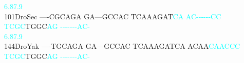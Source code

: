 \documentclass[11pt,twoside,reqno,a4paper]{article}
\begin{document}
{\hspace*{4\charwidth}\hspace*{7\charwidth}\hspace*{1\charwidth}\hspace*{1\charwidth}\hspace*{28\charwidth}\textcolor{cyan}{6.8}\hspace*{1\charwidth}\hspace*{1\charwidth}\hspace*{17\charwidth}\textcolor{cyan}{7.9}\hspace*{1\charwidth}\hspace*{1\charwidth}\\
101\hspace*{1\charwidth}DroSec	----CGCAGA	GA---GCCAC	TCAAAGAT\textcolor{cyan}{C}\textcolor{cyan}{A}	\textcolor{cyan}{A}\textcolor{cyan}{C}\textcolor{cyan}{-}\textcolor{cyan}{-}\textcolor{cyan}{-}\textcolor{cyan}{-}\textcolor{cyan}{-}\textcolor{cyan}{-}\textcolor{cyan}{C}\textcolor{cyan}{C}	\textcolor{cyan}{T}\textcolor{cyan}{C}\textcolor{cyan}{G}\textcolor{cyan}{C}TGGC\textcolor{cyan}{A}\textcolor{cyan}{G}	\textcolor{cyan}{-}\textcolor{cyan}{-}\textcolor{cyan}{-}\textcolor{cyan}{-}\textcolor{cyan}{-}\textcolor{cyan}{-}\textcolor{cyan}{-}\textcolor{cyan}{A}\textcolor{cyan}{C}\textcolor{cyan}{-}	\\
\hspace*{4\charwidth}\hspace*{7\charwidth}\hspace*{1\charwidth}\hspace*{1\charwidth}\hspace*{28\charwidth}\textcolor{cyan}{6.8}\hspace*{1\charwidth}\hspace*{1\charwidth}\hspace*{17\charwidth}\textcolor{cyan}{7.9}\hspace*{1\charwidth}\hspace*{1\charwidth}\\
144\hspace*{1\charwidth}DroYak	----TGCAGA	GA---GCCAC	TCAAAGATCA	ACAA\textcolor{cyan}{C}\textcolor{cyan}{A}\textcolor{cyan}{A}\textcolor{cyan}{C}\textcolor{cyan}{C}\textcolor{cyan}{C}	\textcolor{cyan}{T}\textcolor{cyan}{C}\textcolor{cyan}{G}\textcolor{cyan}{C}TGGC\textcolor{cyan}{A}\textcolor{cyan}{G}	\textcolor{cyan}{-}\textcolor{cyan}{-}\textcolor{cyan}{-}\textcolor{cyan}{-}\textcolor{cyan}{-}\textcolor{cyan}{-}\textcolor{cyan}{-}\textcolor{cyan}{A}\textcolor{cyan}{C}\textcolor{cyan}{-}	\\
}
\end{document}
